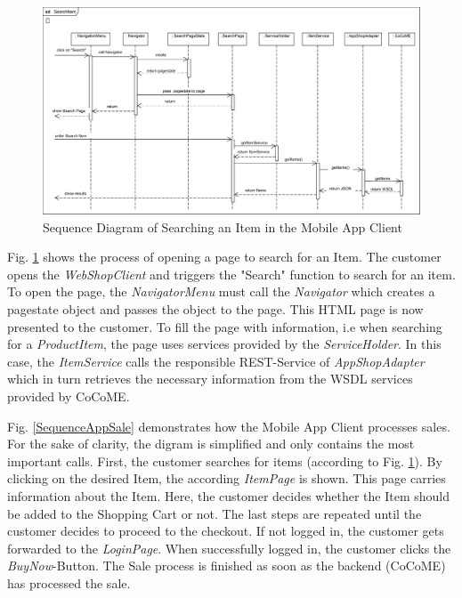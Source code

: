 \begin{figure}[!h]
	\includegraphics[width=\textwidth]{img/appSearchSequence.png}
	\caption{Sequence Diagram of Searching an Item in the Mobile App Client}
	\label{SequenceAppSearch}
\end{figure}

Fig. \ref{SequenceAppSearch} shows the process of opening a page to search for an Item. The customer opens the \textit{WebShopClient} and triggers the "Search" function to search for an item. To open the page, the \textit{NavigatorMenu} must call the \textit{Navigator} which creates a pagestate object and passes the object to the page. This HTML page is now presented to the customer. To fill the page with information, i.e when searching for a \textit{ProductItem}, the page uses services provided by the \textit{ServiceHolder}. In this case, the \textit{ItemService} calls the responsible REST-Service of \textit{AppShopAdapter} which in turn retrieves the necessary information from the WSDL services provided by CoCoME.


Fig. \ref{SequenceAppSale} demonstrates how the Mobile App Client processes sales.  For the sake of clarity, the digram is simplified and only contains the most important calls. First, the customer searches for items (according to Fig. \ref{SequenceAppSearch}). By clicking on the desired Item, the according \textit{ItemPage} is shown. This page carries information about the Item. Here, the customer decides whether the Item should be added to the Shopping Cart or not. The last steps are repeated until the customer decides to proceed to the checkout. If not logged in, the customer gets forwarded to the \textit{LoginPage}. When successfully logged in, the customer clicks the \textit{BuyNow}-Button. The Sale process is finished as soon as the backend (CoCoME) has processed the sale.




